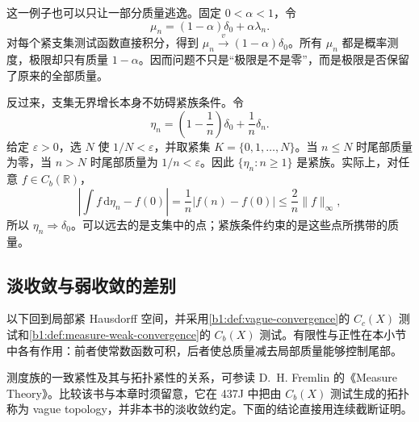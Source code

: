 \ProseParagraphBreak

这一例子也可以只让一部分质量逃逸。固定 \(0<\alpha<1\)，令
\[
 \mu_n=(1-\alpha)\delta_0+\alpha\lambda_n.
\]
对每个紧支集测试函数直接积分，得到 \(\mu_n\xrightarrow{v}(1-\alpha)\delta_0\)。所有 \(\mu_n\) 都是概率测度，极限却只有质量 \(1-\alpha\)。因而问题不只是“极限是不是零”，而是极限是否保留了原来的全部质量。

\ProseParagraphBreak

反过来，支集无界增长本身不妨碍紧族条件。令
\[
 \eta_n=\left(1-\frac1n\right)\delta_0+\frac1n\delta_n.
\]
给定 \(\varepsilon>0\)，选 \(N\) 使 \(1/N<\varepsilon\)，并取紧集 \(K=\{0,1,\ldots,N\}\)。当 \(n\leq N\) 时尾部质量为零，当 \(n>N\) 时尾部质量为 \(1/n<\varepsilon\)。因此 \(\{\eta_n:n\geq1\}\) 是紧族。实际上，对任意 \(f\in C_b(\mathbb R)\)，
\[
 \left|\int f\,\mathrm d\eta_n-f(0)\right|
 =\frac1n\bigl|f(n)-f(0)\bigr|
 \leq\frac2n\|f\|_\infty,
\]
所以 \(\eta_n\Rightarrow\delta_0\)。可以远去的是支集中的点；紧族条件约束的是这些点所携带的质量。

\subsection{淡收敛与弱收敛的差别}
\label{b1:subsec:120303}

以下回到局部紧 Hausdorff 空间，并采用\cref{b1:def:vague-convergence}的 \(C_c(X)\) 测试和\cref{b1:def:measure-weak-convergence}的 \(C_b(X)\) 测试。有限性与正性在本小节中各有作用：前者使常数函数可积，后者使总质量减去局部质量能够控制尾部。

\ProseParagraphBreak

测度族的一致紧性及其与拓扑紧性的关系，可参读 D.~H. Fremlin 的《Measure Theory》\cite[437O--P]{Fremlin2016Measure}。比较该书与本章时须留意，它在 437J 中把由 \(C_b(X)\) 测试生成的拓扑称为 vague topology，并非本书的淡收敛约定。下面的结论直接用连续截断证明。

